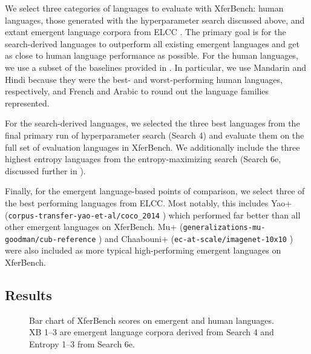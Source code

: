 We select three categories of languages to evaluate with XferBench:
  human languages, those generated with the hyperparameter search discussed above, and extant emergent language corpora from ELCC \citep[\smallish\url{https://huggingface.co/datasets/bboldt/elcc}, CC BY 4.0]{elcc}.
The primary goal is for the search-derived languages to outperform all existing emergent languages and get as close to human language performance as possible.
For the human languages, we use a subset of the baselines provided in \citet{xferbench}.
In particular, we use Mandarin and Hindi because they were the best- and worst-performing human languages, respectively, and French and Arabic to round out the language families represented.

For the search-derived languages, we selected the three best languages from the final primary run of hyperparameter search (Search 4) and evaluate them on the full set of evaluation languages in XferBench.
We additionally include the three highest entropy languages from the entropy-maximizing search (Search 6e, discussed further in ).

Finally, for the emergent language-based points of comparison, we select three of the best performing languages from ELCC\@.
Most notably, this includes Yao+ (\texttt{\smallish corpus-transfer-\allowbreak yao-et-al/\mbox{coco\_2014}} \citep{yao2022linking}) which performed far better than all other emergent languages on XferBench.
Mu+ (\texttt{\smallish generalizations-\allowbreak mu-goodman/\allowbreak cub-reference} \citep{mu2021generalizations}) and Chaabouni+ (\texttt{\smallish ec-at-scale/imagenet-10x10} \citep{chaabouni2022emergent}) were also included as more typical high-performing emergent languages on XferBench.


\subsection{Results}
\begin{figure}
  \centering
  \caption{Bar chart of XferBench scores on emergent and human languages.  XB 1--3 are emergent language corpora derived from Search 4 and Entropy 1--3 from Search 6e.}
  \unskip\label{hpo:fig:bar}
\end{figure}

